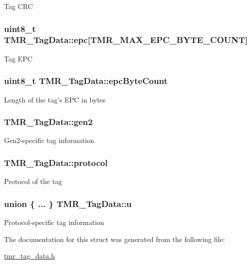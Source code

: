 Tag CRC \hypertarget{struct_t_m_r___tag_data_4f93cf257db348393277b792004d8923}{
\subsubsection[{epc}]{\setlength{\rightskip}{0pt plus 5cm}uint8\_\-t {\bf TMR\_\-TagData::epc}\mbox{[}TMR\_\-MAX\_\-EPC\_\-BYTE\_\-COUNT\mbox{]}}}
\label{struct_t_m_r___tag_data_4f93cf257db348393277b792004d8923}


Tag EPC \hypertarget{struct_t_m_r___tag_data_35dd257d58a4d5a3f4e4178a6f961f77}{
\subsubsection[{epcByteCount}]{\setlength{\rightskip}{0pt plus 5cm}uint8\_\-t {\bf TMR\_\-TagData::epcByteCount}}}
\label{struct_t_m_r___tag_data_35dd257d58a4d5a3f4e4178a6f961f77}


Length of the tag's EPC in bytes \hypertarget{struct_t_m_r___tag_data_2fb9c8ed3770aa54ec3b266a98dc9361}{
\subsubsection[{gen2}]{ {\bf TMR\_\-TagData::gen2}}}
\label{struct_t_m_r___tag_data_2fb9c8ed3770aa54ec3b266a98dc9361}


Gen2-specific tag information \hypertarget{struct_t_m_r___tag_data_2e68f5026358cf4f83694ea89d926b66}{
\subsubsection[{protocol}]{ {\bf TMR\_\-TagData::protocol}}}
\label{struct_t_m_r___tag_data_2e68f5026358cf4f83694ea89d926b66}


Protocol of the tag \hypertarget{struct_t_m_r___tag_data_37f17300bc0e1089399f25866676404e}{
\subsubsection[{u}]{\setlength{\rightskip}{0pt plus 5cm}union \{ ... \}  {\bf TMR\_\-TagData::u}}}
\label{struct_t_m_r___tag_data_37f17300bc0e1089399f25866676404e}


Protocol-specific tag information 

The documentation for this struct was generated from the following file:\begin{CompactItemize}
\item 
\hyperlink{tmr__tag__data_8h}{tmr\_\-tag\_\-data.h}\end{CompactItemize}
